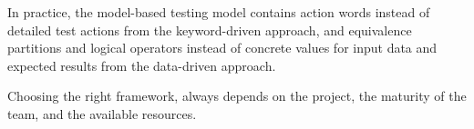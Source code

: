 In practice, the model-based testing model contains action words instead of
detailed test actions from the keyword-driven approach, and equivalence
partitions and logical operators instead of concrete values for input data and
expected results from the data-driven approach.

Choosing the right framework, always depends on the project, the maturity of the
team, and the available resources.

